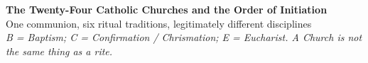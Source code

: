 \providecommand{\churchesInitiationTitle}{The Twenty-Four Catholic Churches and the Order of Initiation}
\providecommand{\churchesInitiationPageHook}{}
\providecommand{\churchesInitiationEndHook}{}

\begin{landscape}
\hypersetup{pdfview=Fit}
\churchesInitiationPageHook
{}
\thispagestyle{plain}
\begin{center}
{\Large\bfseries \churchesInitiationTitle}\\[0.15em]
{\small One communion, six ritual traditions, legitimately different disciplines}\\[-0.1em]
{\scriptsize\emph{B = Baptism; C = Confirmation / Chrismation; E = Eucharist. A Church  is not the same thing as a rite.}}
\end{center}
\vspace{-0.45em}


\end{landscape}
